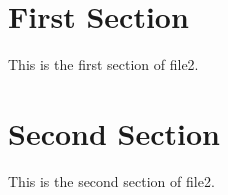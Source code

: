 \documentclass{article}
\begin{document}
\section{First Section}
\label{sec:1}

This is the first section of file2.
\newpage

\section{Second Section}
\label{sec:2}

This is the second section of file2.
\end{document}
